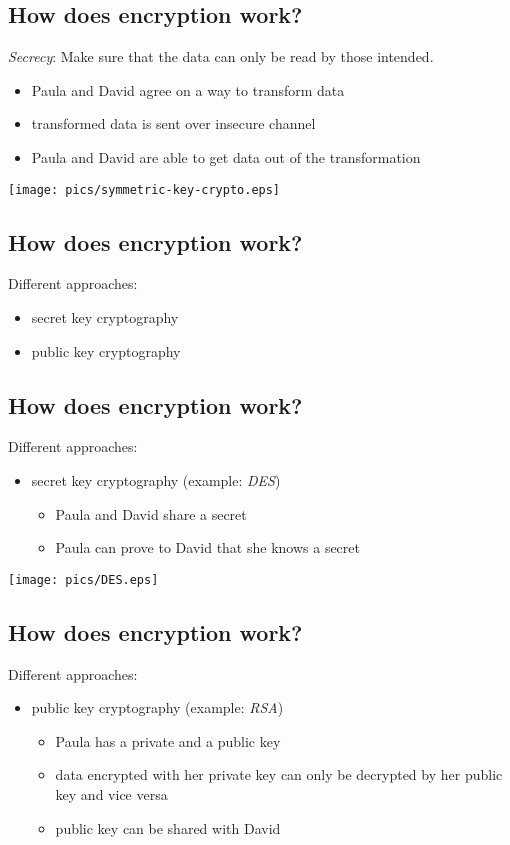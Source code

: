 \documentclass[xga]{xdvislides}
\begin{document}
\subsection{How does encryption work?}
{\em Secrecy}:  Make sure that the data can only be read by those intended.
\begin{itemize}
	\item {}Paula and David agree on a way to transform data
	\item transformed data is sent over insecure channel
	\item Paula and David are able to get data out of the transformation
\end{itemize}
\addvspace{.5in}
\begin{center}
	\texttt{[image: pics/symmetric-key-crypto.eps]}
\end{center}

\subsection{How does encryption work?}
Different approaches:
\begin{itemize}
	\item secret key cryptography
	\item public key cryptography
\end{itemize}

\subsection{How does encryption work?}
Different approaches:
\begin{itemize}
	\item secret key cryptography (example: {\em DES})
		\begin{itemize}
			\item Paula and David share a secret
			\item Paula can prove to David that she knows a secret
		\end{itemize}
\end{itemize}

 \begin{center}
        \texttt{[image: pics/DES.eps]}
 \end{center}

\subsection{How does encryption work?}
Different approaches:
\begin{itemize}
	\item public key cryptography (example: {\em RSA})
		\begin{itemize}
			\item Paula has a private and a public key
			\item data encrypted with her private key can only be decrypted by
				her public key and vice versa
			\item public key can be shared with David
		\end{itemize}
\end{itemize}
\end{document}
